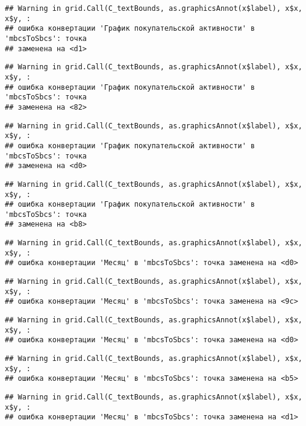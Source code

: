 \documentclass[
]{article}
\begin{document}
\begin{verbatim}
## Warning in grid.Call(C_textBounds, as.graphicsAnnot(x$label), x$x, x$y, :
## ошибка конвертации 'График покупательской активности' в 'mbcsToSbcs': точка
## заменена на <d1>
\end{verbatim}

\begin{verbatim}
## Warning in grid.Call(C_textBounds, as.graphicsAnnot(x$label), x$x, x$y, :
## ошибка конвертации 'График покупательской активности' в 'mbcsToSbcs': точка
## заменена на <82>
\end{verbatim}

\begin{verbatim}
## Warning in grid.Call(C_textBounds, as.graphicsAnnot(x$label), x$x, x$y, :
## ошибка конвертации 'График покупательской активности' в 'mbcsToSbcs': точка
## заменена на <d0>
\end{verbatim}

\begin{verbatim}
## Warning in grid.Call(C_textBounds, as.graphicsAnnot(x$label), x$x, x$y, :
## ошибка конвертации 'График покупательской активности' в 'mbcsToSbcs': точка
## заменена на <b8>
\end{verbatim}

\begin{verbatim}
## Warning in grid.Call(C_textBounds, as.graphicsAnnot(x$label), x$x, x$y, :
## ошибка конвертации 'Месяц' в 'mbcsToSbcs': точка заменена на <d0>
\end{verbatim}

\begin{verbatim}
## Warning in grid.Call(C_textBounds, as.graphicsAnnot(x$label), x$x, x$y, :
## ошибка конвертации 'Месяц' в 'mbcsToSbcs': точка заменена на <9c>
\end{verbatim}

\begin{verbatim}
## Warning in grid.Call(C_textBounds, as.graphicsAnnot(x$label), x$x, x$y, :
## ошибка конвертации 'Месяц' в 'mbcsToSbcs': точка заменена на <d0>
\end{verbatim}

\begin{verbatim}
## Warning in grid.Call(C_textBounds, as.graphicsAnnot(x$label), x$x, x$y, :
## ошибка конвертации 'Месяц' в 'mbcsToSbcs': точка заменена на <b5>
\end{verbatim}

\begin{verbatim}
## Warning in grid.Call(C_textBounds, as.graphicsAnnot(x$label), x$x, x$y, :
## ошибка конвертации 'Месяц' в 'mbcsToSbcs': точка заменена на <d1>
\end{verbatim}
\end{document}

